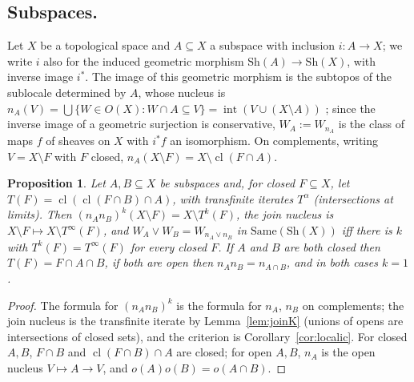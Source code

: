 \documentclass[11pt]{amsart}
\newtheorem{prop}[thm]{Proposition}
\theoremstyle{definition}
\newcommand{\Same}{\mathrm{Same}}
\newcommand{\Sh}{\mathrm{Sh}}
\begin{document}
\subsection*{Subspaces.}
Let $X$ be a topological space and $A\subseteq X$ a subspace with inclusion
$i\colon A\to X$; we write $i$ also for the induced geometric morphism
$\Sh(A)\to\Sh(X)$, with inverse image $i^*$. The image of this geometric
morphism is
the subtopos of the sublocale determined by $A$, whose nucleus is
$n_A(V)=\bigcup\{W\in O(X):W\cap A\subseteq V\}=\operatorname{int}(V\cup
(X\setminus A))$ \cite[II.2]{StoneSpaces}; since the inverse image of a
geometric surjection is conservative, $W_A:=W_{n_A}$ is the class of maps
$f$ of sheaves on $X$ with $i^*f$ an isomorphism. On complements, writing
$V=X\setminus F$ with $F$ closed, $n_A(X\setminus F)=X\setminus
\operatorname{cl}(F\cap A)$.

\begin{prop}\label{prop:subspace}
Let $A,B\subseteq X$ be subspaces and, for closed $F\subseteq X$, let
$T(F)=\operatorname{cl}(\operatorname{cl}(F\cap B)\cap A)$, with transfinite
iterates $T^\alpha$ (intersections at limits). Then
$(n_An_B)^k(X\setminus F)=X\setminus T^k(F)$, the join nucleus is
$X\setminus F\mapsto X\setminus T^\infty(F)$, and $W_A\vee W_B=
W_{n_A\vee n_B}$ in $\Same(\Sh(X))$ iff there is $k$ with
$T^k(F)=T^\infty(F)$ for every closed $F$. If $A$ and $B$ are both closed
then $T(F)=F\cap A\cap B$, if both are open then $n_An_B=n_{A\cap B}$, and in
both cases $k=1$.
\end{prop}
\begin{proof}
The formula for $(n_An_B)^k$ is the formula for $n_A$, $n_B$ on complements;
the join nucleus is the transfinite iterate by Lemma~\ref{lem:joinK}
(unions of opens are intersections of closed sets), and the criterion is
Corollary~\ref{cor:localic}. For closed $A,B$, $F\cap B$ and
$\operatorname{cl}(F\cap B)\cap A$ are closed; for open $A,B$, $n_A$ is the
open nucleus $V\mapsto A\to V$, and $o(A)o(B)=o(A\cap B)$.
\end{proof}
\end{document}
